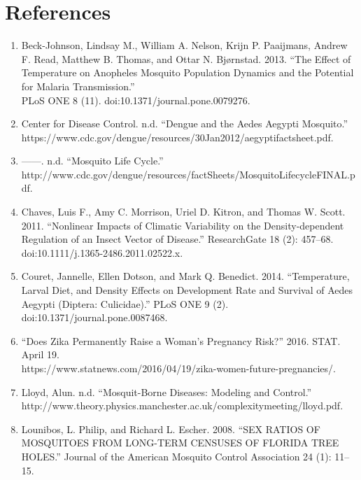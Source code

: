 \documentclass{article}
\begin{document}
\section{References}
\begin{enumerate}
    \item Beck-Johnson, Lindsay M., William A. Nelson, Krijn P. Paaijmans, Andrew F. Read, Matthew B. Thomas, and Ottar N. Bjørnstad. 2013. “The Effect of Temperature on Anopheles Mosquito Population Dynamics and the Potential for Malaria Transmission.”\\ PLoS ONE 8 (11). doi:10.1371/journal.pone.0079276.
    
    \item Center for Disease Control. n.d. “Dengue and the Aedes Aegypti Mosquito.” https://www.cdc.gov/dengue/resources/30Jan2012/aegyptifactsheet.pdf.
    
    \item ——. n.d. “Mosquito Life Cycle.”\\ http://www.cdc.gov/dengue/resources/factSheets/MosquitoLifecycleFINAL.pdf.
    
    \item Chaves, Luis F., Amy C. Morrison, Uriel D. Kitron, and Thomas W. Scott. 2011. “Nonlinear Impacts of Climatic Variability on the Density‐dependent Regulation of an Insect Vector of Disease.” ResearchGate 18 (2): 457–68. doi:10.1111/j.1365-2486.2011.02522.x.
    
    \item Couret, Jannelle, Ellen Dotson, and Mark Q. Benedict. 2014. “Temperature, Larval Diet, and Density Effects on Development Rate and Survival of Aedes Aegypti (Diptera: Culicidae).” PLoS ONE 9 (2).\\ doi:10.1371/journal.pone.0087468.
    
    \item “Does Zika Permanently Raise a Woman’s Pregnancy Risk?” 2016. STAT. April 19.\\ https://www.statnews.com/2016/04/19/zika-women-future-pregnancies/.
    
    \item Lloyd, Alun. n.d. “Mosquit-Borne Diseases: Modeling and Control.” http://www.theory.physics.manchester.ac.uk/complexitymeeting/lloyd.pdf.
    
    \item Lounibos, L. Philip, and Richard L. Escher. 2008. “SEX RATIOS OF MOSQUITOES FROM LONG-TERM CENSUSES OF FLORIDA TREE HOLES.” Journal of the American Mosquito Control Association 24 (1): 11–15.
    

\end{enumerate}
\end{document}
